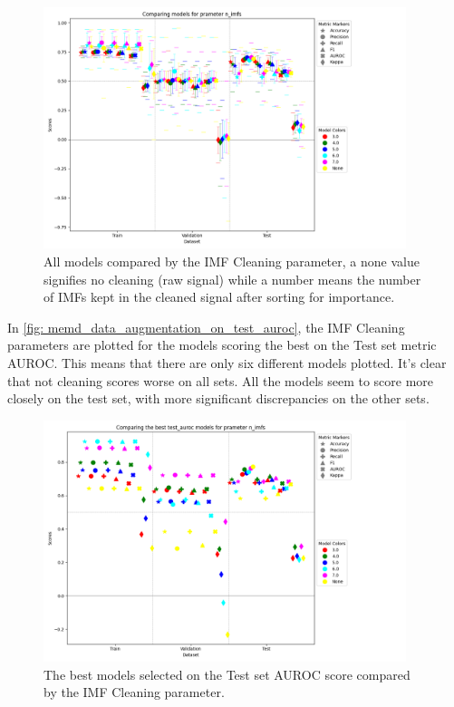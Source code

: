 \begin{figure}[H]
    \centering
    \includegraphics[width=400px]{Figures/results/n_imfs/n_imfs.png}
    \caption{All models compared by the IMF Cleaning parameter, a none value signifies no cleaning (raw signal) while a number means the number of IMFs kept in the cleaned signal after sorting for importance.}
    \label{fig: n_imfs}
\end{figure}


In \autoref{fig: memd_data_augmentation_on_test_auroc}, the IMF Cleaning parameters are plotted for the models scoring the best on the Test set metric AUROC. This means that there are only six different models plotted. It's clear that not cleaning scores worse on all sets. All the models seem to score more closely on the test set, with more significant discrepancies on the other sets. 


\begin{figure}[H]
    \centering
    \includegraphics[width=400px]{Figures/results/n_imfs/n_imfs_test_auroc.png}
    \caption{The best models selected on the Test set AUROC score compared by the IMF Cleaning parameter.}
    \label{fig: n_imfs_test_auroc}
\end{figure}

